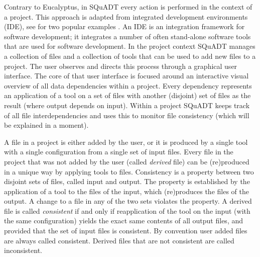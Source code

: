 \documentclass{article}
\newcommand{\squadt}{SQuADT\xspace}
\begin{document}
  
  Contrary to Eucalyptus, in \squadt every action is performed in the context
  of a project. This approach is adapted from integrated development
  environments (IDE), see \cite{Eclipse,NetBeans} for two popular examples .
  An IDE is an integration framework for software development; it integrates a
  number of often stand-alone software tools that are used for software
  development. In the project context \squadt manages a collection of files and
  a collection of tools that can be used to add new files to a project. The
  user observes and directs this process through a graphical user interface.
  The core of that user interface is focused around an interactive visual
  overview of all data dependencies within a project.  Every dependency
  represents an application of a tool on a set of files with another (disjoint)
  set of files as the result (where output depends on input).  Within a project
  \squadt keeps track of all file interdependencies and uses this to monitor
  file consistency (which will be explained in a moment).

  A file in a project is either added by the user, or it is produced by a
  single tool with a single configuration from a single set of input files.
  Every file in the project that was not added by the user (called
  \textit{derived} file) can be (re)produced in a unique way by applying tools
  to files. Consistency is a property between two disjoint sets of files,
  called input and output. The property is established by the application of a
  tool to the files of the input, which (re)produces the files of the output. A
  change to a file in any of the two sets violates the property. A derived file
  is called \textit{consistent} if and only if reapplication of the tool on the
  input (with the same configuration) yields the exact same contents of all
  output files, and provided that the set of input files is consistent. By
  convention user added files are always called consistent. Derived files that
  are not consistent are called inconsistent.
  
\end{document}
